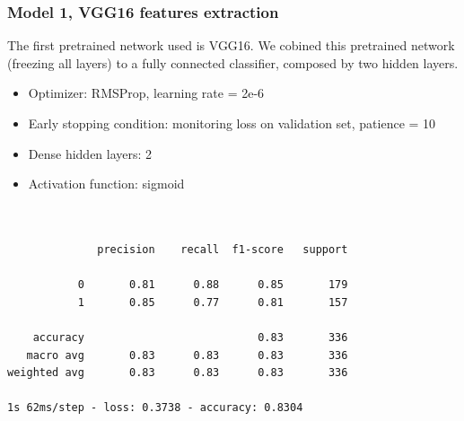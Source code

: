 \documentclass{article}
\begin{document}
\subsubsection{Model 1, VGG16 features extraction}
The first pretrained network used is VGG16. We cobined this pretrained network (freezing all layers) to a fully connected classifier, composed by two hidden layers.\\

\begin{itemize}
\item Optimizer: RMSProp, learning rate = 2e-6
\item Early stopping condition: monitoring loss on validation set, patience = 10
\item Dense hidden layers: 2
\item Activation function: sigmoid
\end{itemize}

\begin{verbatim}


              precision    recall  f1-score   support

           0       0.81      0.88      0.85       179
           1       0.85      0.77      0.81       157

    accuracy                           0.83       336
   macro avg       0.83      0.83      0.83       336
weighted avg       0.83      0.83      0.83       336

1s 62ms/step - loss: 0.3738 - accuracy: 0.8304

\end{verbatim}
\end{document}

